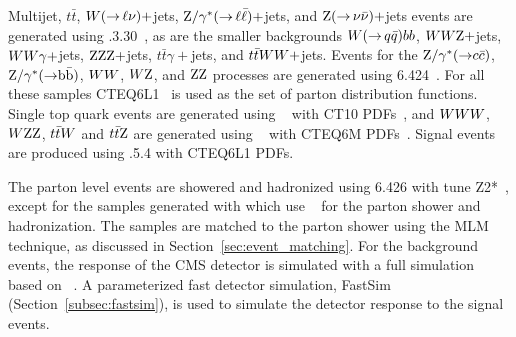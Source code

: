 Multijet, $t\bar{t}$, $W({\rightarrow}\,\ell\nu)+$jets, $\mathrm{Z}/\gamma^*({\rightarrow}\,
\ell\bar{\ell})+$jets, and $\mathrm{Z}({\rightarrow}\, \nu \bar{\nu})+$jets events are generated using
.3.30~\cite{Alwall:2011uj}, as are the smaller backgrounds $W({\rightarrow}\, q
\bar{q})bb$, 
$WW\mathrm{Z}+$jets, $WW\gamma+$jets, $\mathrm{Z}\mathrm{Z}\mathrm{Z}+$jets, $t\bar{t}\gamma+$jets, and
$t\bar{t}WW+$jets.
Events for the $\mathrm{Z}/\gamma^*({\rightarrow} c\bar{c})$, $\mathrm{Z}/\gamma^*({\rightarrow}
\mathrm{b}\bar{\mathrm{b}})$,
$WW$, $W\mathrm{Z}$, and $\mathrm{Z}\mathrm{Z}$ processes are generated using 
{\PYTHIA}6.424~\cite{Sjostrand:2006za}.
For all these samples CTEQ6L1~\cite{Pumplin:2002vw} is used as the set of parton distribution
functions. 
Single top quark events are generated using ~\cite{powheg,powheg2} with CT10
PDFs~\cite{Lai:2010vv}, and $WWW$, $W\mathrm{Z}\mathrm{Z}$, $t\bar{t}W$ and $t\bar{t}\mathrm{Z}$ are generated using
\AMCATNLO~\cite{Frixione:2002ik} with CTEQ6M PDFs~\cite{Pumplin:2002vw}. 
Signal events are produced using .5.4 with CTEQ6L1 PDFs.  

The parton level events are showered and hadronized using {\PYTHIA}6.426 with tune
Z2*~\cite{Chatrchyan:2013gfi}, except for the samples generated with \AMCATNLO which use 
\HERWIG~\cite{Corcella:2000bw,Corcella:2002jc} for the parton shower and hadronization.  
The \MADGRAPH samples are matched to the parton shower using the MLM technique, as discussed
in Section~\ref{sec:event_matching}.
For the background events, the response of the CMS detector is
simulated with a full simulation based on \GEANTfour~\cite{G4}.  
A parameterized fast detector simulation, \ie FastSim (Section~\ref{subsec:fastsim}), is used to
simulate the detector response to the signal events. 


